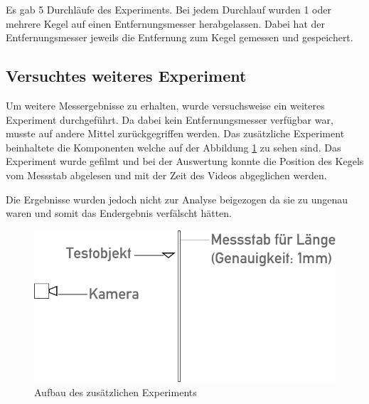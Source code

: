 Es gab 5 Durchläufe des Experiments. Bei jedem Durchlauf wurden 1 oder mehrere Kegel auf einen Entfernungsmesser herabgelassen. Dabei hat der Entfernungsmesser jeweils die Entfernung zum Kegel gemessen und gespeichert.



\subsection{Versuchtes weiteres Experiment}

Um weitere Messergebnisse zu erhalten, wurde versuchsweise ein weiteres Experiment durchgeführt. Da dabei kein Entfernungsmesser verfügbar war, musste auf andere Mittel zurückgegriffen werden. Das zusätzliche Experiment beinhaltete die Komponenten welche auf der Abbildung \ref{fig:addexp} zu sehen sind. Das Experiment wurde gefilmt und bei der Auswertung konnte die Position des Kegels vom Messstab abgelesen und mit der Zeit des Videos abgeglichen werden.

Die Ergebnisse wurden jedoch nicht zur Analyse beigezogen da sie zu ungenau waren und somit das Endergebnis verfälscht hätten.

\begin{figure}
	\center
	\includegraphics{diagrams/aufbau2}
	\caption{\label{fig:addexp} Aufbau des zusätzlichen Experiments}
\end{figure}